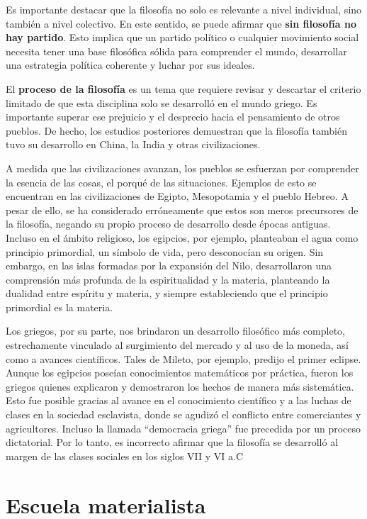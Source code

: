 \documentclass[
  letterpaper,
  DIV=11,
  numbers=noendperiod]{scrartcl}
\begin{document}
Es importante destacar que la filosofía no solo es relevante a nivel
individual, sino también a nivel colectivo. En este sentido, se puede
afirmar que \textbf{sin filosofía no hay partido}. Esto implica que un
partido político o cualquier movimiento social necesita tener una base
filosófica sólida para comprender el mundo, desarrollar una estrategia
política coherente y luchar por sus ideales.

El \textbf{proceso de la filosofía} es un tema que requiere revisar y
descartar el criterio limitado de que esta disciplina solo se desarrolló
en el mundo griego. Es importante superar ese prejuicio y el desprecio
hacia el pensamiento de otros pueblos. De hecho, los estudios
posteriores demuestran que la filosofía también tuvo su desarrollo en
China, la India y otras civilizaciones.

A medida que las civilizaciones avanzan, los pueblos se esfuerzan por
comprender la esencia de las cosas, el porqué de las situaciones.
Ejemplos de esto se encuentran en las civilizaciones de Egipto,
Mesopotamia y el pueblo Hebreo. A pesar de ello, se ha considerado
erróneamente que estos son meros precursores de la filosofía, negando su
propio proceso de desarrollo desde épocas antiguas. Incluso en el ámbito
religioso, los egipcios, por ejemplo, planteaban el agua como principio
primordial, un símbolo de vida, pero desconocían su origen. Sin embargo,
en las islas formadas por la expansión del Nilo, desarrollaron una
comprensión más profunda de la espiritualidad y la materia, planteando
la dualidad entre espíritu y materia, y siempre estableciendo que el
principio primordial es la materia.

Los griegos, por su parte, nos brindaron un desarrollo filosófico más
completo, estrechamente vinculado al surgimiento del mercado y al uso de
la moneda, así como a avances científicos. Tales de Mileto, por ejemplo,
predijo el primer eclipse. Aunque los egipcios poseían conocimientos
matemáticos por práctica, fueron los griegos quienes explicaron y
demostraron los hechos de manera más sistemática. Esto fue posible
gracias al avance en el conocimiento científico y a las luchas de clases
en la sociedad esclavista, donde se agudizó el conflicto entre
comerciantes y agricultores. Incluso la llamada ``democracia griega''
fue precedida por un proceso dictatorial. Por lo tanto, es incorrecto
afirmar que la filosofía se desarrolló al margen de las clases sociales
en los siglos VII y VI a.C

\hypertarget{escuela-materialista}{%
\section{Escuela materialista}\label{escuela-materialista}}
\end{document}
